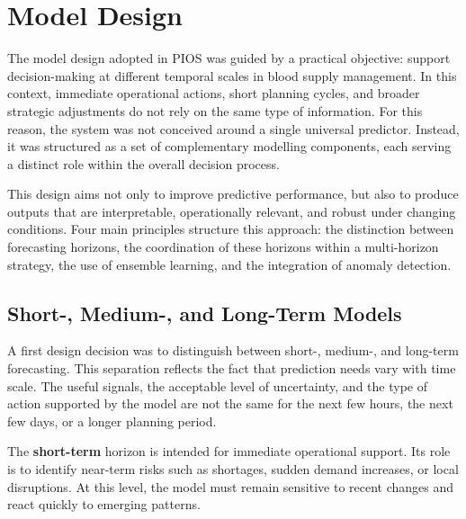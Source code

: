 
\section{Model Design}
\label{sec:model-conception}

The model design adopted in PIOS was guided by a practical objective: support decision-making at different temporal scales in blood supply management. In this context, immediate operational actions, short planning cycles, and broader strategic adjustments do not rely on the same type of information. For this reason, the system was not conceived around a single universal predictor. Instead, it was structured as a set of complementary modelling components, each serving a distinct role within the overall decision process.

This design aims not only to improve predictive performance, but also to produce outputs that are interpretable, operationally relevant, and robust under changing conditions. Four main principles structure this approach: the distinction between forecasting horizons, the coordination of these horizons within a multi-horizon strategy, the use of ensemble learning, and the integration of anomaly detection.

\subsection{Short-, Medium-, and Long-Term Models}
\label{sec:short-medium-long-models}

A first design decision was to distinguish between short-, medium-, and long-term forecasting. This separation reflects the fact that prediction needs vary with time scale. The useful signals, the acceptable level of uncertainty, and the type of action supported by the model are not the same for the next few hours, the next few days, or a longer planning period.

The \textbf{short-term} horizon is intended for immediate operational support. Its role is to identify near-term risks such as shortages, sudden demand increases, or local disruptions. At this level, the model must remain sensitive to recent changes and react quickly to emerging patterns.

